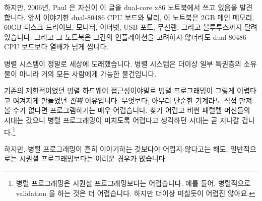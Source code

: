 {	하지만, 2006년, Paul 은 자신이 이 글을 dual-core x86 노트북에서 쓰고
	있음을 발견합니다.
	앞서 이야기한 dual-80486 CPU 보드와 달리, 이 노트북은 2GB 메인 메모리,
	60GB 디스크 드라이브, 모니터, 이더넷, USB 포트, 무선랜, 그리고
	블루투스까지 달려 있습니다.
	그리고 그 노트북은 그간의 인플레이션을 고려하지 않더라도 dual-80486 CPU
	보드보다 열배가 넘게 쌉니다.


	병렬 시스템이 정말로 세상에 도래했습니다.
	병렬 시스템은 더이상 일부 특권층의 소유물이 아니라 거의 모든 사람에게
	가능한 물건입니다.


	기존의 제한적이었던 병렬 하드웨어 접근성이야말로 병렬 프로그래밍이
	그렇게 어렵다고 여겨지게 만들었던 \emph{진짜} 이유입니다.
	무엇보다, 아무리 단순한 기계라도 직접 만져볼 수가 없다면 프로그램하기는
	매우 어렵습니다.
	찾기 어렵고 비싼 패럴렐 머신들의 시대는 갔으니 병렬 프로그래밍이
	미치도록 어렵다고 생각하던 시대는 곧 지나갈 겁니다.\footnote{
		병렬 프로그래밍은 시퀀셜 프로그래밍보다는 어렵습니다. 예를
		들어, 병렬적으로 validation 을 하는 것은 더 어렵습니다.
		하지만 더이상 미칠듯이 어렵진 않아요.}

} \QuickQuizEnd

하지만, 병렬 프로그래밍이 흔히 이야기하는 것보다야 어렵지 않다고는 해도,
일반적으로는 시퀀셜 프로그래밍보다는 어려운 경우가 많습니다.


